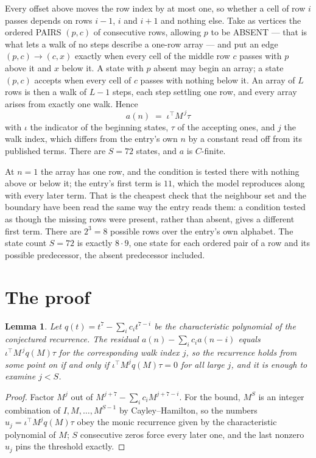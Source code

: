 \documentclass[11pt,a4paper]{article}
\theoremstyle{plain}
\newtheorem{lemma}[theorem]{Lemma}
\theoremstyle{definition}
\begin{document}
Every offset above moves the row index by at most one, so whether a cell of row $i$ passes
depends on rows $i-1$, $i$ and $i+1$ and nothing else. Take as vertices the ordered PAIRS
$(p,c)$ of consecutive rows, allowing $p$ to be ABSENT --- that is what lets a walk of no steps
describe a one-row array --- and put an edge $(p,c)\to(c,x)$ exactly when every cell of the
middle row $c$ passes with $p$ above it and $x$ below it. A state with $p$ absent may begin an
array; a state $(p,c)$ accepts when every cell of $c$ passes with nothing below it. An array of
$L$ rows is then a walk of $L-1$ steps, each step settling one row, and every array arises from
exactly one walk. Hence
\[
a(n)\;=\;\iota^{\!\top}M^{\,j}\tau
\]
with $\iota$ the indicator of the beginning states, $\tau$ of the accepting ones, and $j$ the
walk index, which differs from the entry's own $n$ by a constant read off from its published
terms. There are $S=72$ states, and $a$ is $C$-finite.

At $n=1$ the array has one row, and
the condition is tested there with nothing above or below it; the entry's first term is
$11$, which the model reproduces along with every later term. That is the cheapest check
that the neighbour set and the boundary have been read the same way the entry reads them: a
condition tested as though the missing rows were present, rather than absent, gives a different
first term. There are $2^{3}=8$ possible rows over the entry's own alphabet. The state count $S=72$ is exactly $8\cdot9$,
one state for each ordered pair of a row and its possible predecessor, the absent predecessor
included.

\section{The proof}

\begin{lemma}\label{lem:crit}
Let $q(t)=t^{7}-\sum_i c_it^{7-i}$ be the characteristic polynomial of the
conjectured recurrence. The residual $a(n)-\sum_ic_ia(n-i)$ equals
$\iota^{\!\top}M^{\,j}q(M)\tau$ for the corresponding walk index $j$, so the recurrence
holds from some point on if and only if $\iota^{\!\top}M^{j}q(M)\tau=0$ for all large $j$,
and it is enough to examine $j<S$.
\end{lemma}

\begin{proof}
Factor $M^{j}$ out of $M^{j+7}-\sum_ic_iM^{j+7-i}$. For the bound, $M^{S}$
is an integer combination of $I,M,\dots,M^{S-1}$ by Cayley--Hamilton, so the numbers
$u_j=\iota^{\!\top}M^{j}q(M)\tau$ obey the monic recurrence given by the characteristic
polynomial of $M$; $S$ consecutive zeros force every later one, and the last nonzero $u_j$
pins the threshold exactly.
\end{proof}
\end{document}
